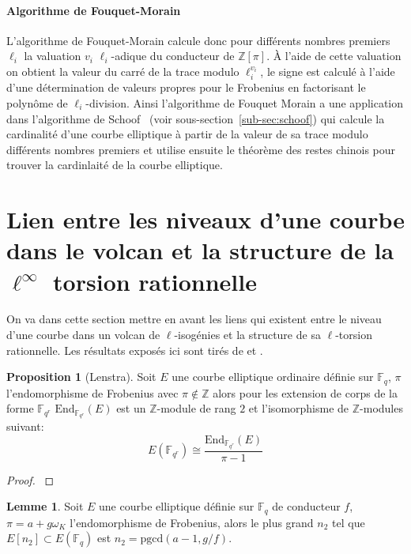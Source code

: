 \documentclass[10pt,a4paper]{book}
\theoremstyle{plain}
\theoremstyle{definition}
\newtheorem{lem}[thm]{Lemme}
\theoremstyle{definition}
\theoremstyle{definition}
\newtheorem{prop}[thm]{Proposition}
\theoremstyle{definition}
\theoremstyle{remark}
\theoremstyle{remark}
\theoremstyle{definition}
\begin{document}
\paragraph{Algorithme de Fouquet-Morain}
L'algorithme de Fouquet-Morain \cite{FouquetMorain02} calcule donc pour 
différents nombres premiers $\ell_i$ la valuation $v_i$ $\ell_i$-adique du 
conducteur de $\mathbb{Z}[\pi]$. \`A l'aide de cette valuation on obtient la 
valeur du carré de la trace modulo $\ell_i^{v_i}$, le signe est calculé à 
l'aide d'une détermination de valeurs propres pour le Frobenius en factorisant 
le polynôme de $\ell_i$-division. Ainsi l'algorithme de Fouquet Morain a une 
application dans l'algorithme de Schoof~\cite{Schoof85} (voir 
sous-section~\ref{sub-sec:schoof}) qui calcule la cardinalité d'une courbe
elliptique à partir de la valeur de sa trace modulo différents nombres premiers
et utilise ensuite le théorème des restes chinois pour trouver la cardinlaité 
de la courbe elliptique. 



\section{Lien entre les niveaux d'une courbe dans le volcan et la structure de la $\ell^{\infty}$ torsion rationnelle}
\label{sec:lie:niv}
On va dans cette section mettre en avant les liens qui existent entre le niveau
d'une courbe dans un volcan de $\ell$-isogénies et la structure de sa 
$\ell$-torsion rationnelle. Les résultats exposés ici sont tirés de 
\cite{MiretMSTV08} et \cite{Ionica-Joux10}.

\begin{prop}[Lenstra]
\label{pro:len:str}
Soit $E$ une courbe elliptique ordinaire définie sur $\mathbb{F}_q$, $\pi$ 
l'endomorphisme de Frobenius avec $\pi \not \in \mathbb{Z}$ alors pour les 
extension de corps de la forme $\mathbb{F}_{q^r}$ $\mathrm{End}_{
\mathbb{F}_{q^r}}(E)$ est un $\mathbb{Z}$-module de rang $2$ et l'isomorphisme 
de $\mathbb{Z}$-modules suivant:
\[
E(\mathbb{F}_{q^r}) \cong \frac{\mathrm{End}_{\mathbb{F}_{q^r}}(E)}{\pi-1}
\] 
\end{prop}
\begin{proof}
\cite[Theorem 1]{Lenstra1996}
\end{proof}

\begin{lem}
\label{lem:ruc:rat}
Soit $E$ une courbe elliptique définie sur $\mathbb{F}_q$ de conducteur $f$, 
$\pi=a+g \omega_K$ l'endomorphisme de Frobenius, alors le plus grand $n_2$ tel 
que $E[n_2] \subset E(\mathbb{F}_q)$ est $n_2=\mathrm{pgcd}(a-1,g/f)$.
\end{lem}
\end{document}
